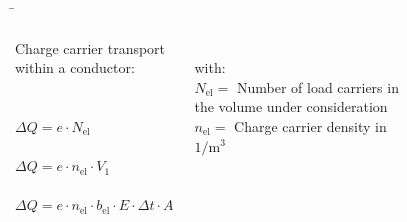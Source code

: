 \begin{frame}
	\b{

	
	\begin{columns}
      Charge carrier transport within a conductor:\\

		\phantom{.}\\

		\phantom{text}\\
		$\Delta Q = e \cdot N_\mathrm{el} $\\

		\phantom{text}\\

		$\Delta Q = e \cdot n_\mathrm{el} \cdot V_1$\\

		\phantom{text}\\

	$\Delta Q = e \cdot n_\mathrm{el} \cdot b_\mathrm{el} \cdot E \cdot \Delta t \cdot A$

		\phantom{.}\\

		with:\\
		$N_\mathrm{el} =$ Number of load carriers in the volume under consideration\\

		$n_\mathrm{el} = $  Charge carrier density in $1/\mathrm{m}^3$






	

		
		


		\begin{figure}[h!]
			\centering
			
			
		\end{figure}


\end{columns}}
\end{frame}
